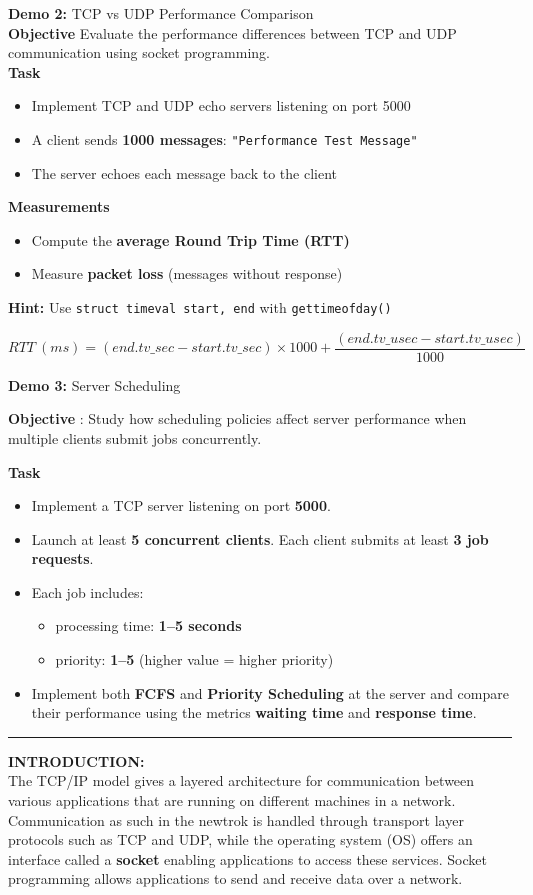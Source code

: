 \documentclass[a4paper,12pt]{article}
\begin{document}
\noindent \textbf{Demo 2:} TCP vs UDP Performance Comparison\\
\noindent \textbf{Objective}
\noindent Evaluate the performance differences between TCP and UDP communication using socket programming.\\
\noindent \textbf{Task}
\begin{itemize}
    \item Implement TCP and UDP echo servers listening on port 5000
    \item A client sends \textbf{1000 messages}: \texttt{"Performance Test Message"}
    \item The server echoes each message back to the client
\end{itemize}
\noindent \textbf{Measurements}
\begin{itemize}
    \item Compute the \textbf{average Round Trip Time (RTT)}
    \item Measure \textbf{packet loss} (messages without response)
\end{itemize}

\noindent \textbf{Hint:} Use \texttt{struct timeval start, end} with \texttt{gettimeofday()}

\[
RTT\ (ms) = (end.tv\_sec - start.tv\_sec) \times 1000 
+ \frac{(end.tv\_usec - start.tv\_usec)}{1000}
\]

\noindent \textbf{Demo 3:} Server Scheduling

\noindent \textbf{Objective} : Study how scheduling policies affect server performance when multiple clients submit jobs concurrently.

\noindent \textbf{Task}

\begin{itemize}
    \item Implement a TCP server listening on port \textbf{5000}.
    \item Launch at least \textbf{5 concurrent clients}. Each client submits at least \textbf{3 job requests}.
    \item Each job includes:
    \begin{itemize}
        \item processing time: \textbf{1--5 seconds}
        \item priority: \textbf{1--5} (higher value = higher priority)
    \end{itemize}
    \item Implement both \textbf{FCFS} and \textbf{Priority Scheduling} at the server and compare their performance using the metrics \textbf{waiting time} and \textbf{response time}.
\end{itemize}
\noindent
\rule{\textwidth}{2pt}
\noindent
\textbf{INTRODUCTION: }\\
The TCP/IP model gives a layered architecture for communication between various applications that are running on different machines in a network. Communication as such in the newtrok is handled through transport layer protocols such as TCP and UDP, while the operating system (OS) offers an interface called a \textbf{socket} enabling applications to access these services. Socket programming allows applications to send and receive data over a network.\\
\end{document}
